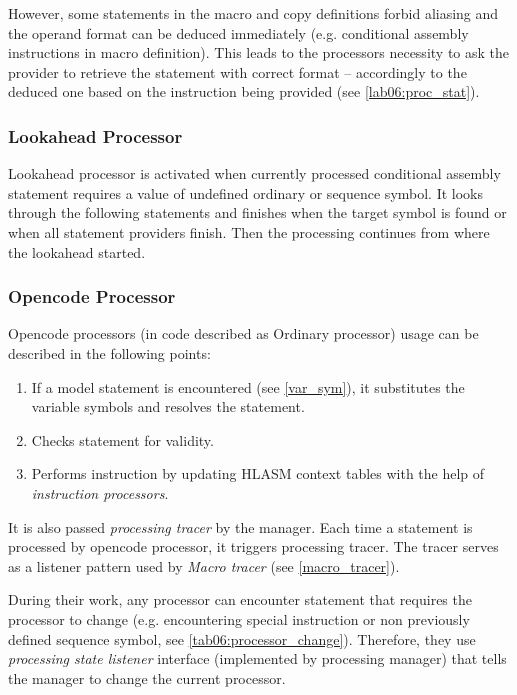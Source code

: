 However, some statements in the macro and copy definitions forbid aliasing and the operand format can be deduced immediately (e.g. conditional assembly instructions in macro definition). This leads to the processors necessity to ask the provider to retrieve the statement with correct format -- accordingly to the deduced one based on the instruction being provided  (see \cref{lab06:proc_stat}).

\subsubsection{Lookahead Processor}
\label{lab06:look}

Lookahead processor is activated when currently processed conditional assembly statement requires a value of undefined ordinary or sequence symbol. It looks through the following statements and finishes when the target symbol is found or when all statement providers finish. Then the processing continues from where the lookahead started.

\subsubsection{Opencode Processor}
\label{ord_proc}
Opencode processors (in code described as Ordinary processor) usage can be described in the following points:
\begin{enumerate}
	\item If a model statement is encountered (see \cref{var_sym}), it substitutes the variable symbols and resolves the statement.
	\item Checks statement for validity.
	\item Performs instruction by updating HLASM context tables with the help of \emph{instruction processors}.
\end{enumerate}

It is also passed \emph{processing tracer} by the manager. Each time a statement is processed by opencode processor, it triggers processing tracer. The tracer serves as a listener pattern used by \emph{Macro tracer} (see \cref{macro_tracer}).

\vspace{0.5cm}

During their work, any processor can encounter statement that requires the processor to change (e.g. encountering special instruction or non previously defined sequence symbol, see \cref{tab06:processor_change}). Therefore, they use \emph{processing state listener} interface (implemented by processing manager) that tells the manager to change the current processor.

